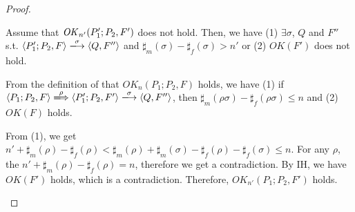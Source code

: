 \begin{proof}
\begin{itemize}
  Assume that \(\mathit{OK}_{n'}(P_1';P_2, F') \) does not hold. Then, we have
  (1) \( \exists \sigma \), \(Q\) and \(F''\) s.t. \( \langle
  P_1';P_2, F \rangle \xlongrightarrow{\sigma} \langle Q, F'' \rangle
  \) and \(\sharp_{m}(\sigma) - \sharp_{f}(\sigma) > n'\)
  or (2) \( OK(F')\) does not hold.

  From the definition of that \(OK_n(P_1;P_2, F)\) holds, we have (1)
  if \( \langle P_1;P_2, F \rangle \xLongrightarrow{\rho} \langle
  P_1';P_2, F' \rangle \xlongrightarrow{\sigma} \langle Q, F'' \rangle
  \), then \(\sharp_m(\rho\sigma) -
  \sharp_f(\rho\sigma) \le n \) and (2) \(OK(F)\) holds.

  From (1), we get \( n' + \sharp_m(\rho) - \sharp_f(\rho) <
  \sharp_m(\rho) + \sharp_m(\sigma) - \sharp_f(\rho) -
  \sharp_f(\sigma) \le n\). For any \(\rho\), the \( n' +
  \sharp_m(\rho) - \sharp_f(\rho) = n\), therefore we get a
  contradiction. By IH, we have \(OK(F')\) holds, which is a
  contradiction. Therefore, \(OK_{n'}(P_1;P_2, F')\) holds.

\end{itemize}
\end{proof}

